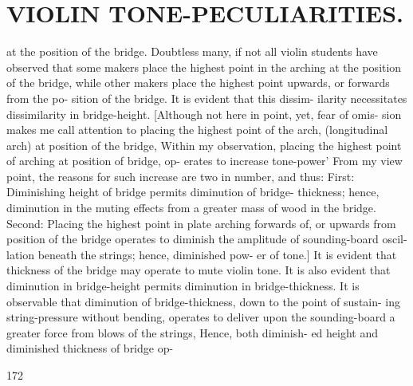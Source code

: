 \documentclass{article}
\begin{document}
\section*{VIOLIN TONE-PECULIARITIES.}
at the position of the bridge. Doubtless many, if not all violin students have observed that some makers place the highest point in the arching at the position of the bridge, while other makers place the highest point upwards, or forwards from the po- sition of the bridge. It is evident that this dissim- ilarity necessitates dissimilarity in bridge-height. [Although not here in point, yet, fear of omis- sion makes me call attention to placing the highest point of the arch, (longitudinal arch) at position of the bridge, Within my observation, placing the highest point of arching at position of bridge, op- erates to increase tone-power' From my view point, the reasons for such increase are two in number, and thus: First: Diminishing height of bridge permits diminution of bridge- thickness; hence, diminution in the muting effects from a greater mass of wood in the bridge. Second: Placing the highest point in plate arching forwards of, or upwards from position of the bridge operates to diminish the amplitude of sounding-board oscil- lation beneath the strings; hence, diminished pow- er of tone.] It is evident that thickness of the bridge may operate to mute violin tone. It is also evident that diminution in bridge-height permits diminution in bridge-thickness. It is observable that diminution of bridge-thickness, down to the point of sustain- ing string-pressure without bending, operates to deliver upon the sounding-board a greater force from blows of the strings, Hence, both diminish- ed height and diminished thickness of bridge op-

172
\end{document}
